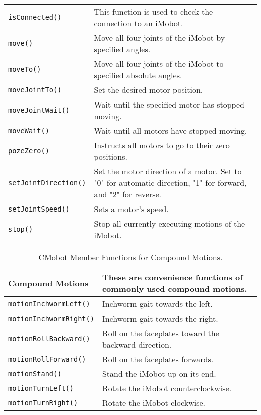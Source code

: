 \begin{table}[!hp]
\begin{center}
\begin{tabular}{p{38 mm}p{77 mm}}
\texttt{isConnected()} & This function is used to check the connection to an iMobot. \\
\texttt{move()} & Move all four joints of the iMobot by specified angles. \\
\texttt{moveTo()} & Move all four joints of the iMobot to specified absolute angles. \\
\texttt{moveJointTo()} & Set the desired motor position. \\
\texttt{moveJointWait()} & Wait until the specified motor has stopped moving. \\
\texttt{moveWait()} & Wait until all motors have stopped moving. \\
\texttt{pozeZero()} & Instructs all motors to go to their zero positions. \\
\texttt{setJointDirection()} & Set the motor direction of a motor. Set
to "0" for automatic direction, "1" for forward, and "2" for reverse. \\
\texttt{setJointSpeed()} & Sets a motor's speed. \\
\texttt{stop()} & Stop all currently executing motions of the iMobot. \\
\hline
\end{tabular}
\end{center}
\label{mobilec_api_cbinary}
\end{table}

\begin{table}[!h]
\begin{center}
\caption{CMobot Member Functions for Compound Motions.}
\begin{tabular}{p{38 mm}p{77 mm}}
Compound Motions & These are convenience functions of commonly used compound motions. \\
\hline
\texttt{motionInchwormLeft()} \dotfill & Inchworm gait towards the left. \\
\texttt{motionInchwormRight()} \dotfill & Inchworm gait towards the right. \\
\texttt{motionRollBackward()} \dotfill & Roll on the faceplates toward the backward direction. \\
\texttt{motionRollForward()} \dotfill & Roll on the faceplates forwards. \\
\texttt{motionStand()} \dotfill & Stand the iMobot up on its end. \\
\texttt{motionTurnLeft()} \dotfill & Rotate the iMobot counterclockwise. \\
\texttt{motionTurnRight()} \dotfill & Rotate the iMobot clockwise. \\
\hline
\end{tabular}
\end{center}
\label{mobilec_api_compound}
\end{table}

